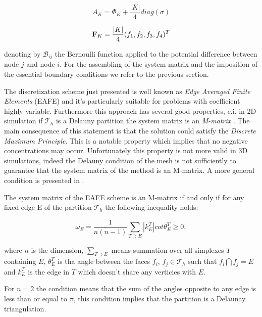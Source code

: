 \begin{equation}
\label{eq: matrice continuità}
A_K = \Phi_K + \dfrac{|K|}{4} diag (\sigma)
\end{equation}

\begin{equation}
\mathbf{F}_K = \dfrac{|K|}{4} (f_1,f_2,f_3,f_4)^T
\end{equation}

denoting by  $\mathcal{B}_{ij}$ the Bernoulli function applied to the potential difference between node $j$ and node $i$.
For the assembling of the system matrix and the imposition of the essential boundary conditions we refer to the previous section.

The discretization scheme just presented is well known as \textit{Edge Averaged Finite Elements} (EAFE) and it's particularly suitable for problems with coefficient highly variable. Furthermore this approach has several good properties, e.i. in 2D simulation if $\mathcal{T}_h$ is a Delauny partition the system matrix is an \textit{M-matrix} \cite{BankMmatrixEAFE}. The main consequence of this statement is that the solution could satisfy the \textit{Discrete Maximum Principle}. This is a notable property which implies that no negative concentrations may occur. Unfortunately this property is not more valid in 3D simulations, indeed the Delauny condition of the mesh is not sufficiently to guarantee that the system matrix of the method is an M-matrix. A more general condition is presented in \cite{ZikatanovXu}.

\begin{Teorema}
The system matrix of the EAFE scheme is an M-matrix if and only if for any fixed edge E of the partition $\mathcal{T}_h$ the following inequality holds:

\begin{equation}
\label{eq: mesh delaunay condition}
\omega_E = \dfrac{1}{n(n-1)} \sum_{T\supset E} |k_E^T|cot\theta_E^T \geq 0,
\end{equation}

where $n$ is the dimension, $\sum_{T \supset E}$ means summation over all simplexes $T$ containing $E$, $\theta_E^T$ is tha angle between the faces $f_i$, $f_j \in \mathcal{T}_h$ such that $f_i \bigcap f_j = E$  and $k_E^T$ is the edge in $T$ which doesn't share any verticies with $E$.
\end{Teorema}

\begin{Osservazione}
For $n=2$ the condition  means that the sum of the angles opposite to any edge is less than or equal to $\pi$, this condition implies that the partition is a Delaunay triangulation.
\end{Osservazione}

